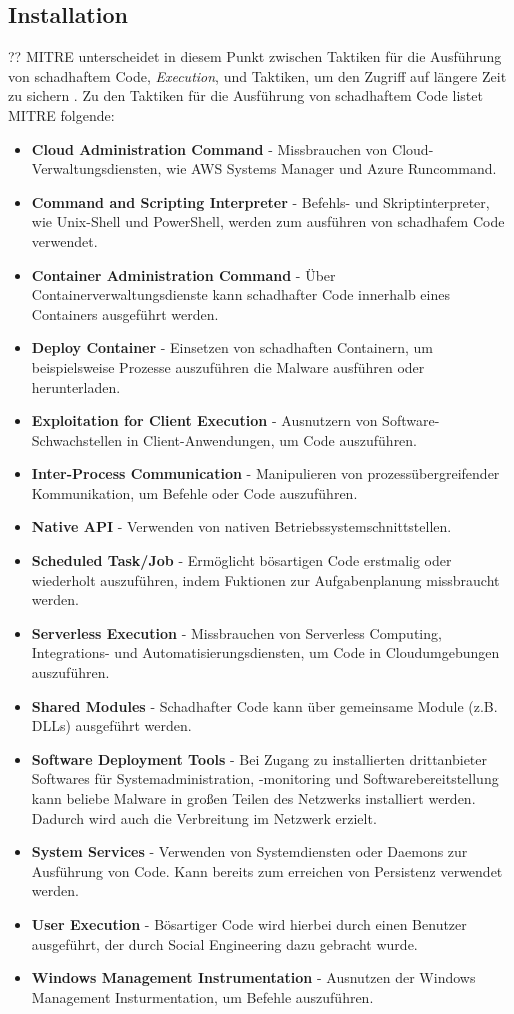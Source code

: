 \documentclass[conference]{IEEEtran}
\begin{document}
\subsection{Installation}
??
MITRE \cite{MITREEnterpriseTactics} unterscheidet in diesem Punkt zwischen Taktiken für die Ausführung von schadhaftem Code, \textit{Execution}, und Taktiken, um den Zugriff auf längere Zeit zu sichern \cite{MITREEnterpriseTactics}.
Zu den Taktiken für die Ausführung von schadhaftem Code listet MITRE \cite{MITREExecution} folgende:
\begin{itemize}
    \item \textbf{Cloud Administration Command} - Missbrauchen von Cloud-Verwaltungsdiensten, wie AWS Systems Manager und Azure Runcommand.
    \item \textbf{Command and Scripting Interpreter} - Befehls- und Skriptinterpreter, wie Unix-Shell und PowerShell, werden zum ausführen von schadhafem Code verwendet.
    \item \textbf{Container Administration Command} - Über Containerverwaltungsdienste kann schadhafter Code innerhalb eines Containers ausgeführt werden.
    \item \textbf{Deploy Container} - Einsetzen von schadhaften Containern, um beispielsweise Prozesse auszuführen die Malware ausführen oder herunterladen.
    \item \textbf{Exploitation for Client Execution} - Ausnutzern von Software-Schwachstellen in Client-Anwendungen, um Code auszuführen.
    \item \textbf{Inter-Process Communication} - Manipulieren von prozessübergreifender Kommunikation, um Befehle oder Code auszuführen.
    \item \textbf{Native API} - Verwenden von nativen Betriebssystemschnittstellen.
    \item \textbf{Scheduled Task/Job} - Ermöglicht bösartigen Code erstmalig oder wiederholt auszuführen, indem Fuktionen zur Aufgabenplanung missbraucht werden.
    \item \textbf{Serverless Execution} - Missbrauchen von Serverless Computing, Integrations- und Automatisierungsdiensten, um Code in Cloudumgebungen auszuführen.
    \item \textbf{Shared Modules} - Schadhafter Code kann über gemeinsame Module (z.B. DLLs) ausgeführt werden.
    \item \textbf{Software Deployment Tools} - Bei Zugang zu installierten drittanbieter Softwares für Systemadministration, -monitoring und Softwarebereitstellung kann beliebe Malware in großen Teilen des Netzwerks installiert werden. Dadurch wird auch die Verbreitung im Netzwerk erzielt.
    \item \textbf{System Services} - Verwenden von Systemdiensten oder Daemons zur Ausführung von Code. Kann bereits zum erreichen von Persistenz verwendet werden.
    \item \textbf{User Execution} - Bösartiger Code wird hierbei durch einen Benutzer ausgeführt, der durch Social Engineering dazu gebracht wurde.
    \item \textbf{Windows Management Instrumentation} - Ausnutzen der Windows Management Insturmentation, um Befehle auszuführen.
\end{itemize}
\end{document}
